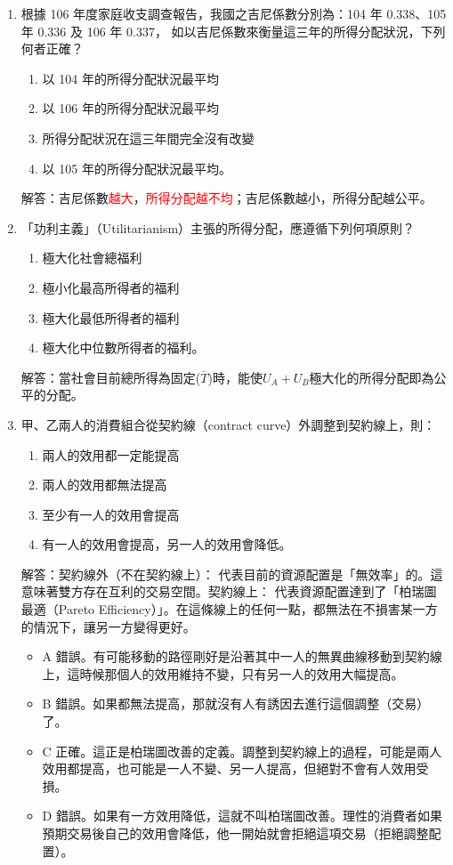 \documentclass[12pt, a4paper]{article}
\begin{document}
\begin{enumerate}
    \item 根據 106 年度家庭收支調查報告，我國之吉尼係數分別為：104 年 0.338、105 年 0.336 及 106 年 0.337， 如以吉尼係數來衡量這三年的所得分配狀況，下列何者正確？
        \begin{enumerate}[label=\Alph*.]
            \item 以 104 年的所得分配狀況最平均
            \item 以 106 年的所得分配狀況最平均
            \item 所得分配狀況在這三年間完全沒有改變
            \item 以 105 年的所得分配狀況最平均。
        \end{enumerate}
        解答：吉尼係數\textcolor{red}{越大}，\textcolor{red}{所得分配越不均}；吉尼係數越小，所得分配越公平。

    \newpage

    \item 「功利主義」（Utilitarianism）主張的所得分配，應遵循下列何項原則？
        \begin{enumerate}[label=\Alph*.]
            \item 極大化社會總福利
            \item 極小化最高所得者的福利
            \item 極大化最低所得者的福利
            \item 極大化中位數所得者的福利。
        \end{enumerate}
        解答：當社會目前總所得為固定($\bar{T}$)時，能使$U_A + U_B$極大化的所得分配即為公平的分配。

    \item 甲、乙兩人的消費組合從契約線（contract curve）外調整到契約線上，則：
        \begin{enumerate}[label=\Alph*.]
            \item 兩人的效用都一定能提高
            \item 兩人的效用都無法提高
            \item 至少有一人的效用會提高
            \item 有一人的效用會提高，另一人的效用會降低。
        \end{enumerate}
        解答：契約線外（不在契約線上）： 代表目前的資源配置是「無效率」的。這意味著雙方存在互利的交易空間。契約線上： 代表資源配置達到了「柏瑞圖最適（Pareto Efficiency）」。在這條線上的任何一點，都無法在不損害某一方的情況下，讓另一方變得更好。
        \begin{itemize}
            \item A 錯誤。有可能移動的路徑剛好是沿著其中一人的無異曲線移動到契約線上，這時候那個人的效用維持不變，只有另一人的效用大幅提高。
            \item B 錯誤。如果都無法提高，那就沒有人有誘因去進行這個調整（交易）了。
            \item C 正確。這正是柏瑞圖改善的定義。調整到契約線上的過程，可能是兩人效用都提高，也可能是一人不變、另一人提高，但絕對不會有人效用受損。
            \item D 錯誤。如果有一方效用降低，這就不叫柏瑞圖改善。理性的消費者如果預期交易後自己的效用會降低，他一開始就會拒絕這項交易（拒絕調整配置）。
        \end{itemize}


\end{enumerate}
\end{document}
